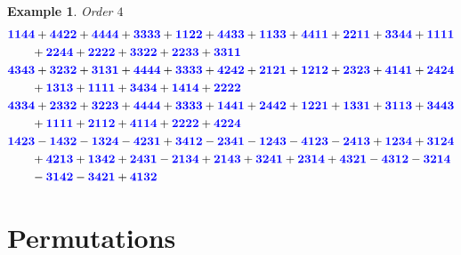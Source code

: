 \documentclass{scrartcl}
\theoremstyle{plain}
\newtheorem{example}[theorem]{Example}
\theoremstyle{definition}
\newcommand{\1}[1]{1_{\{#1\}}}
\def\word#1{{\color{blue}\mathbf{#1}}}
\begin{document}
\begin{example}
   Order $4$
   \begin{align*}
     &\word{1144} + \word{4422} + \word{4444} + \word{3333} + \word{1122} + \word{4433} + \word{1133} + \word{4411} + \word{2211} + \word{3344} + \word{1111}\\
     &\qquad + \word{2244} + \word{2222} + \word{3322} + \word{2233} + \word{3311} \\
     &\word{4343} + \word{3232} + \word{3131} + \word{4444} + \word{3333} + \word{4242} + \word{2121} + \word{1212} + \word{2323} + \word{4141} + \word{2424}\\
     &\qquad + \word{1313} + \word{1111} + \word{3434} + \word{1414} + \word{2222} \\
     &\word{4334} + \word{2332} + \word{3223} + \word{4444} + \word{3333} + \word{1441} + \word{2442} + \word{1221} + \word{1331} + \word{3113} + \word{3443}\\
     &\qquad + \word{1111} + \word{2112} + \word{4114} + \word{2222} + \word{4224} \\
     &\word{1423} - \word{1432} - \word{1324} - \word{4231} + \word{3412} - \word{2341} - \word{1243} - \word{4123} - \word{2413} + \word{1234} + \word{3124}\\
     &\qquad + \word{4213} + \word{1342} + \word{2431} - \word{2134} + \word{2143} + \word{3241} + \word{2314} + \word{4321} - \word{4312} - \word{3214}\\&\qquad - \word{3142}
     - \word{3421} + \word{4132}
   \end{align*}
\end{example}

\section{Permutations}
\label{sec:permuations}
\end{document}
